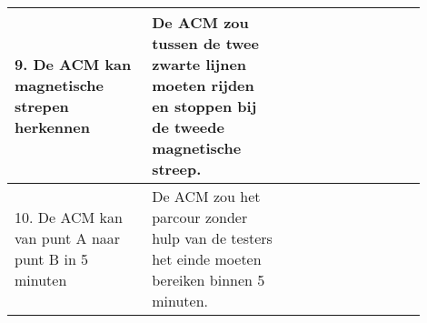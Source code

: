 \begin{center}
\begin{tabular}{p{0.3\linewidth} p{0.3\linewidth} p{0.3\linewidth}}
        \hline
        9. De ACM kan magnetische strepen herkennen                  & De ACM zou tussen de twee zwarte lijnen moeten rijden en stoppen bij de tweede magnetische streep.                                       &                            \\
        \hline
        10. De ACM kan van punt A naar punt B in 5 minuten           & De ACM zou het parcour zonder hulp van de testers het einde moeten bereiken binnen 5 minuten.                                            &                            \\
    \end{tabular}
\end{center}
